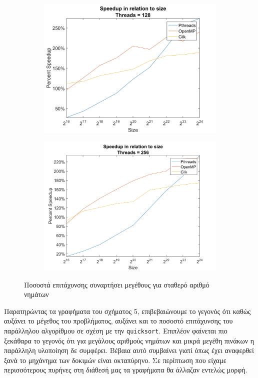 \documentclass[11pt,a4paper,titlepage]{article}
\begin{document}
\begin{figure}[h!]
\begin{subfigure}[b]{0.45\textwidth}
				\includegraphics[width=\textwidth]{figures/figure-4.7.png}
				\caption{}
			\end{subfigure}
			\begin{subfigure}[b]{0.45\textwidth}
				\includegraphics[width=\textwidth]{figures/figure-4.8.png}
				\caption{}
			\end{subfigure}
			\caption{Ποσοστά επιτάχυνσης συναρτήσει μεγέθους για σταθερό αριθμό νημάτων}	  
		\end{figure}
		Παρατηρώντας τα γραφήματα του σχήματος 5, επιβεβαιώνουμε το γεγονός ότι καθώς αυξάνει το μέγεθος του προβλήματος, αυξάνει και το ποσοστό επιτάχυνσης του παράλληλου αλγορίθμου σε σχέση με την \verb|quicksort|. Επιπλέον φαίνεται πιο ξεκάθαρα το γεγονός ότι για μεγάλους αριθμούς νημάτων και μικρά μεγέθη πινάκων η παράλληλη υλοποίηση δε συμφέρει. Βέβαια αυτό συμβαίνει γιατί όπως έχει αναφερθεί ξανά το μηχάνημα των δοκιμών είναι οκταπύρηνο. Σε περίπτωση που είχαμε περισσότερους πυρήνες στη διάθεσή μας τα γραφήματα θα άλλαζαν εντελώς μορφή. \\
		
\end{document}
